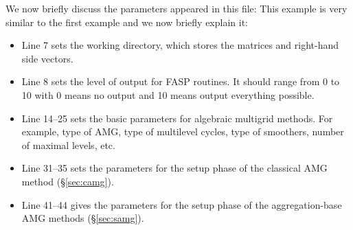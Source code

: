 \documentclass[11pt]{memoir}
\begin{document}
%
We now briefly discuss the parameters appeared in this file:
%
This example is very similar to the first example and we now briefly explain it:
\begin{itemize}
%
\item Line 7 sets the working directory, which stores the matrices and right-hand side vectors. 
%
\item Line 8 sets the level of output for FASP routines. It should range from 0 to 10 with 0 means no output and 10 means output everything possible. 
%
\item Line 14--25 sets the basic parameters for algebraic multigrid methods. For example, type of AMG, type of multilevel cycles, type of smoothers, number of maximal levels, etc. 
%
\item Line 31--35 sets the parameters for the setup phase of the classical AMG method (\S\ref{sec:camg}).
%
\item Line 41--44 gives the parameters for the setup phase of the aggregation-base AMG methods (\S\ref{sec:samg}). 
%
\end{itemize}
%
\end{document}
